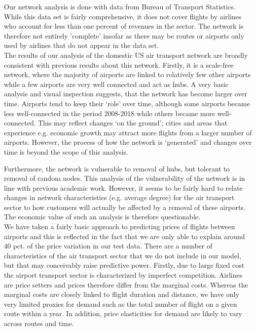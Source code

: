\label{sec:results}
Our network analysis is done with data from Bureau of Transport Statistics. While this data set is fairly comprehensive, it does not cover flights by airlines who account for less than one percent of revenues in the sector. The network is therefore not entirely 'complete' insofar as there may be routes or airports only used by airlines that do not appear in the data set.
\medskip\\
The results of our analysis of the domestic US air transport network are broadly consistent with previous results about this network. Firstly, it is a scale-free network, where the majority of airports are linked to relatively few other airports while a few airports are very well connected and act as hubs. A very basic analysis and visual inspection suggests, that the network has become larger over time. Airports tend to keep their `role' over time, although some airports became less well-connected in the period 2008-2018 while others became more well-connected. This may reflect changes `on the ground'; cities and areas that experience e.g. economic growth may attract more flights from a larger number of airports. However, the process of how the network is `generated' and changes over time is beyond the scope of this analysis.
\par
Furthermore, the network is vulnerable to removal of hubs, but tolerant to removal of random nodes. This analysis of the vulnerability of the network is in line with previous academic work. However, it seems to be fairly hard to relate changes in network characteristics (e.g. average degree) for the air transport sector to how customers will actually be affected by a removal of these airports. The economic value of such an analysis is therefore questionable.
\medskip\\
We have taken a fairly basic approach to predicting prices of flights between airports and this is reflected in the fact that we are only able to explain around 40 pct. of the price variation in our test data. There are a number of characteristics of the air transport sector that we do not include in our model, but that may conceivably raise predictive power. Firstly, due to large fixed cost the airport transport sector is characterized by imperfect competition. Airlines are price setters and prices therefore differ from the marginal costs. Whereas the marginal costs are closely linked to flight duration and distance, we have only very limited proxies for demand such as the total number of flight on a given route within a year. In addition, price elasticities for demand are likely to vary across routes and time.
